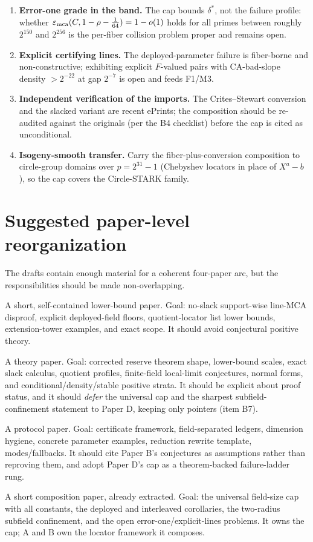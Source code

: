 \documentclass[11pt]{article}
\theoremstyle{definition}
\theoremstyle{remark}
\newcommand{\emca}{\varepsilon_{\rm mca}}
\begin{document}
\begin{enumerate}[label=D\arabic*.,leftmargin=2.2em]
\item \textbf{Error-one grade in the band.}  The cap bounds $\delta^*$, not the failure profile: whether $\emca(C,1-\rho-\frac1{64})=1-o(1)$ holds for all primes between roughly $2^{150}$ and $2^{256}$ is the per-fiber collision problem proper and remains open.
\item \textbf{Explicit certifying lines.}  The deployed-parameter failure is fiber-borne and non-constructive; exhibiting explicit $F$-valued pairs with CA-bad-slope density $>2^{-22}$ at gap $2^{-7}$ is open and feeds F1/M3.
\item \textbf{Independent verification of the imports.}  The Crites--Stewart conversion and the slacked variant are recent ePrints; the composition should be re-audited against the originals (per the B4 checklist) before the cap is cited as unconditional.
\item \textbf{Isogeny-smooth transfer.}  Carry the fiber-plus-conversion composition to circle-group domains over $p=2^{31}-1$ (Chebyshev locators in place of $X^a-b$), so the cap covers the Circle-STARK family.
\end{enumerate}

\section{Suggested paper-level reorganization}

The drafts contain enough material for a coherent four-paper arc, but the responsibilities should be made non-overlapping.

\begin{description}[leftmargin=3.4cm,style=nextline]
\item[Paper A.] A short, self-contained lower-bound paper.  Goal: no-slack support-wise line-MCA disproof, explicit deployed-field floors, quotient-locator list lower bounds, extension-tower examples, and exact scope.  It should avoid conjectural positive theory.
\item[Paper B.] A theory paper.  Goal: corrected reserve theorem shape, lower-bound scales, exact slack calculus, quotient profiles, finite-field local-limit conjectures, normal forms, and conditional/density/stable positive strata.  It should be explicit about proof status, and it should \emph{defer} the universal cap and the sharpest subfield-confinement statement to Paper D, keeping only pointers (item B7).
\item[Paper C.] A protocol paper.  Goal: certificate framework, field-separated ledgers, dimension hygiene, concrete parameter examples, reduction rewrite template, modes/fallbacks.  It should cite Paper B's conjectures as assumptions rather than reproving them, and adopt Paper D's cap as a theorem-backed failure-ladder rung.
\item[Paper D.] A short composition paper, already extracted.  Goal: the universal field-size cap with all constants, the deployed and interleaved corollaries, the two-radius subfield confinement, and the open error-one/explicit-lines problems.  It owns the cap; A and B own the locator framework it composes.
\end{description}
\end{document}

